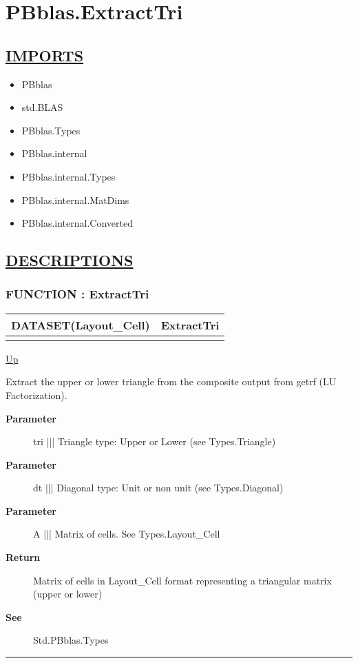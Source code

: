 \chapter*{PBblas.ExtractTri}
\hypertarget{ecldoc:toc:PBblas.ExtractTri}{}

\section*{\underline{IMPORTS}}
\begin{itemize}
\item PBblas
\item std.BLAS
\item PBblas.Types
\item PBblas.internal
\item PBblas.internal.Types
\item PBblas.internal.MatDims
\item PBblas.internal.Converted
\end{itemize}

\section*{\underline{DESCRIPTIONS}}
\subsection*{FUNCTION : ExtractTri}
\hypertarget{ecldoc:pbblas.extracttri}{}

{\renewcommand{\arraystretch}{1.5}
\begin{tabularx}{\textwidth}{|>{\raggedright\arraybackslash}l|X|}
\hline
\hspace{0pt}DATASET(Layout\_Cell) & ExtractTri \\
\hline
\multicolumn{2}{|>{\raggedright\arraybackslash}X|}{\hspace{0pt}(Triangle tri, Diagonal dt, DATASET(Layout\_Cell) A)} \\
\hline
\end{tabularx}
}

\hyperlink{ecldoc:toc:PBblas}{Up}

\par
Extract the upper or lower triangle from the composite output from getrf (LU Factorization).

\par
\begin{description}
\item [\textbf{Parameter}] tri ||| Triangle type: Upper or Lower (see Types.Triangle)
\item [\textbf{Parameter}] dt ||| Diagonal type: Unit or non unit (see Types.Diagonal)
\item [\textbf{Parameter}] A ||| Matrix of cells. See Types.Layout\_Cell
\item [\textbf{Return}] Matrix of cells in Layout\_Cell format representing a triangular matrix (upper or lower)
\item [\textbf{See}] Std.PBblas.Types
\end{description}

\rule{\textwidth}{0.4pt}
